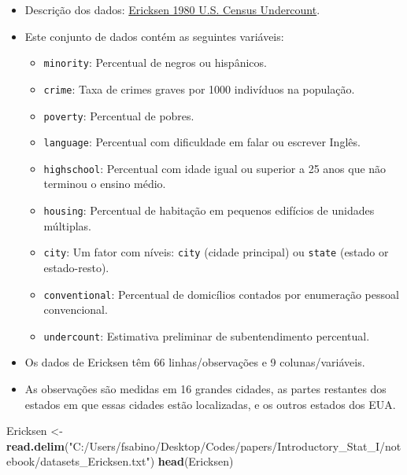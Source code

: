 \documentclass[]{article}
\newenvironment{Shaded}{\begin{snugshade}}{\end{snugshade}}
\newcommand{\KeywordTok}[1]{\textcolor[rgb]{0.13,0.29,0.53}{\textbf{#1}}}
\newcommand{\StringTok}[1]{\textcolor[rgb]{0.31,0.60,0.02}{#1}}
\newcommand{\NormalTok}[1]{#1}
\providecommand{\tightlist}{%
  \setlength{\itemsep}{0pt}\setlength{\parskip}{0pt}}
\begin{document}
\begin{itemize}
\tightlist
\item
  Descrição dos dados:
  \href{http://www.rdocumentation.org/packages/car/functions/Ericksen}{Ericksen
  1980 U.S. Census Undercount}.
\item
  Este conjunto de dados contém as seguintes variáveis:

  \begin{itemize}
  \tightlist
  \item
    \texttt{minority}: Percentual de negros ou hispânicos.
  \item
    \texttt{crime}: Taxa de crimes graves por 1000 indivíduos na
    população.
  \item
    \texttt{poverty}: Percentual de pobres.
  \item
    \texttt{language}: Percentual com dificuldade em falar ou escrever
    Inglês.
  \item
    \texttt{highschool}: Percentual com idade igual ou superior a 25
    anos que não terminou o ensino médio.
  \item
    \texttt{housing}: Percentual de habitação em pequenos edifícios de
    unidades múltiplas.
  \item
    \texttt{city}: Um fator com níveis: \texttt{city} (cidade principal)
    ou \texttt{state} (estado or estado-resto).
  \item
    \texttt{conventional}: Percentual de domicílios contados por
    enumeração pessoal convencional.
  \item
    \texttt{undercount}: Estimativa preliminar de subentendimento
    percentual.
  \end{itemize}
\item
  Os dados de Ericksen têm 66 linhas/observações e 9 colunas/variáveis.
\item
  As observações são medidas em 16 grandes cidades, as partes restantes
  dos estados em que essas cidades estão localizadas, e os outros
  estados dos EUA.
\end{itemize}

\begin{Shaded}
\begin{Highlighting}[]
\NormalTok{Ericksen <-}\StringTok{ }\KeywordTok{read.delim}\NormalTok{(}\StringTok{"C:/Users/fsabino/Desktop/Codes/papers/Introductory_Stat_I/notebook/datasets_Ericksen.txt"}\NormalTok{)}
\KeywordTok{head}\NormalTok{(Ericksen)}
\end{Highlighting}
\end{Shaded}
\end{document}
